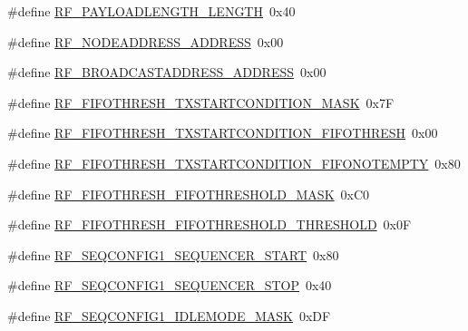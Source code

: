 \begin{DoxyCompactItemize}
\item 
\#define \mbox{\hyperlink{sx1276_regs-_fsk_8h_a5bedd7662c9e637130ec18bbdc710f3c}{R\+F\+\_\+\+P\+A\+Y\+L\+O\+A\+D\+L\+E\+N\+G\+T\+H\+\_\+\+L\+E\+N\+G\+TH}}~0x40
\item 
\#define \mbox{\hyperlink{sx1276_regs-_fsk_8h_acbca54b084bb21f9cd767b00c83dd4a1}{R\+F\+\_\+\+N\+O\+D\+E\+A\+D\+D\+R\+E\+S\+S\+\_\+\+A\+D\+D\+R\+E\+SS}}~0x00
\item 
\#define \mbox{\hyperlink{sx1276_regs-_fsk_8h_a6fe83305d4e9adead59e7783120b0ee5}{R\+F\+\_\+\+B\+R\+O\+A\+D\+C\+A\+S\+T\+A\+D\+D\+R\+E\+S\+S\+\_\+\+A\+D\+D\+R\+E\+SS}}~0x00
\item 
\#define \mbox{\hyperlink{sx1276_regs-_fsk_8h_af0bc1b4471a1dbd9d6e11895fe34d154}{R\+F\+\_\+\+F\+I\+F\+O\+T\+H\+R\+E\+S\+H\+\_\+\+T\+X\+S\+T\+A\+R\+T\+C\+O\+N\+D\+I\+T\+I\+O\+N\+\_\+\+M\+A\+SK}}~0x7F
\item 
\#define \mbox{\hyperlink{sx1276_regs-_fsk_8h_aa6ad7e18fef56fd59458fd8b7e723b14}{R\+F\+\_\+\+F\+I\+F\+O\+T\+H\+R\+E\+S\+H\+\_\+\+T\+X\+S\+T\+A\+R\+T\+C\+O\+N\+D\+I\+T\+I\+O\+N\+\_\+\+F\+I\+F\+O\+T\+H\+R\+E\+SH}}~0x00
\item 
\#define \mbox{\hyperlink{sx1276_regs-_fsk_8h_a25f3a10051bb160b646cbc8f05b99bf8}{R\+F\+\_\+\+F\+I\+F\+O\+T\+H\+R\+E\+S\+H\+\_\+\+T\+X\+S\+T\+A\+R\+T\+C\+O\+N\+D\+I\+T\+I\+O\+N\+\_\+\+F\+I\+F\+O\+N\+O\+T\+E\+M\+P\+TY}}~0x80
\item 
\#define \mbox{\hyperlink{sx1276_regs-_fsk_8h_a11133eab9006138c972b4bbbbcc38ef9}{R\+F\+\_\+\+F\+I\+F\+O\+T\+H\+R\+E\+S\+H\+\_\+\+F\+I\+F\+O\+T\+H\+R\+E\+S\+H\+O\+L\+D\+\_\+\+M\+A\+SK}}~0x\+C0
\item 
\#define \mbox{\hyperlink{sx1276_regs-_fsk_8h_a157d89bed834c9fe81aa8b0a653526c3}{R\+F\+\_\+\+F\+I\+F\+O\+T\+H\+R\+E\+S\+H\+\_\+\+F\+I\+F\+O\+T\+H\+R\+E\+S\+H\+O\+L\+D\+\_\+\+T\+H\+R\+E\+S\+H\+O\+LD}}~0x0F
\item 
\#define \mbox{\hyperlink{sx1276_regs-_fsk_8h_a9374284f8d161876adbfe106d58dd77d}{R\+F\+\_\+\+S\+E\+Q\+C\+O\+N\+F\+I\+G1\+\_\+\+S\+E\+Q\+U\+E\+N\+C\+E\+R\+\_\+\+S\+T\+A\+RT}}~0x80
\item 
\#define \mbox{\hyperlink{sx1276_regs-_fsk_8h_a77b3c19d8d12e5acfe979ab731df8a06}{R\+F\+\_\+\+S\+E\+Q\+C\+O\+N\+F\+I\+G1\+\_\+\+S\+E\+Q\+U\+E\+N\+C\+E\+R\+\_\+\+S\+T\+OP}}~0x40
\item 
\#define \mbox{\hyperlink{sx1276_regs-_fsk_8h_af2acf1e69aca7c8fcd98b364903512c8}{R\+F\+\_\+\+S\+E\+Q\+C\+O\+N\+F\+I\+G1\+\_\+\+I\+D\+L\+E\+M\+O\+D\+E\+\_\+\+M\+A\+SK}}~0x\+DF
\item 

\end{DoxyCompactItemize}

